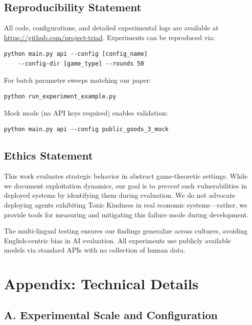 \documentclass{uai2026} %
\begin{document}
\subsection*{Reproducibility Statement}

All code, configurations, and detailed experimental logs are available at \url{https://github.com/project-triad}. Experiments can be reproduced via:
\begin{lstlisting}[basicstyle=\small\ttfamily,breaklines=true]
python main.py api --config [config_name] 
    --config-dir [game_type] --rounds 50
\end{lstlisting}
For batch parameter sweeps matching our paper:
\begin{lstlisting}[basicstyle=\small\ttfamily,breaklines=true]
python run_experiment_example.py
\end{lstlisting}
Mock mode (no API keys required) enables validation:
\begin{lstlisting}[basicstyle=\small\ttfamily,breaklines=true]
python main.py api --config public_goods_3_mock
\end{lstlisting}

\subsection*{Ethics Statement}

This work evaluates strategic behavior in abstract game-theoretic settings. While we document exploitation dynamics, our goal is to \textit{prevent} such vulnerabilities in deployed systems by identifying them during evaluation. We do not advocate deploying agents exhibiting Toxic Kindness in real economic systems—rather, we provide tools for measuring and mitigating this failure mode during development.

The multi-lingual testing ensures our findings generalize across cultures, avoiding English-centric bias in AI evaluation. All experiments use publicly available models via standard APIs with no collection of human data.

\section*{Appendix: Technical Details}

\subsection*{A. Experimental Scale and Configuration}
\end{document}
